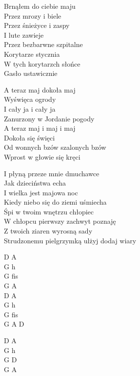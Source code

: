 \begin{text}
    Brnąłem do ciebie maju\\
    Przez mrozy i biele\\
    Przez śnieżyce i zaspy\\
    I lute zawieje\\
    Przez bezbarwne szpitalne\\
    Korytarze stycznia\\
    W tych korytarzch słońce\\
    Gasło ustawicznie

    \vin A teraz maj dokoła maj\\
    \vin Wyświęca ogrody\\
    \vin I cały ja i cały ja\\
    \vin Zanurzony w Jordanie pogody\\
    \vin A teraz maj i maj i maj\\
    \vin Dokoła się święci\\
    \vin Od wonnych bzów szalonych bzów\\
    \vin Wprost w głowie się kręci

    I płyną przeze mnie dmuchawce\\
    Jak dzieciństwa echa\\
    I wielka jest majowa noc\\
    Kiedy niebo się do ziemi uśmiecha\\
    Śpi w twoim wnętrzu chłopiec\\
    W chłopcu pierwszy zachwyt poznaję\\
    Z twoich ziaren wyrosną sady\\
    Strudzonemu pielgrzymką ulżyj dodaj wiary
\end{text}
\begin{chord}
    D A\\
    G h\\
    G fis\\
    G A\\
    D A\\
    G h\\
    G fis\\
    G A D

    D A\\
    G h\\
    G D\\
    G A
\end{chord}